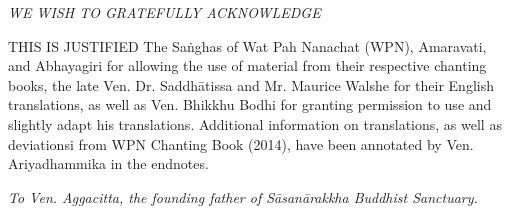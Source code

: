\cleartorecto
\thispagestyle{empty}

\mbox{}\vfill

{\centering\itshape
WE WISH TO GRATEFULLY ACKNOWLEDGE
}

THIS IS JUSTIFIED
The Saṅghas of Wat Pah Nanachat (WPN), Amaravati, and Abhayagiri for allowing the use of material from their respective chanting books, the late Ven. Dr. Saddhātissa and Mr. Maurice Walshe for their English translations, as well as Ven. Bhikkhu Bodhi for granting permission to use and slightly adapt his translations.
Additional information on translations, as well as deviationsi from WPN Chanting Book (2014), have been annotated by Ven. Ariyadhammika in the endnotes.

{\centering\itshape
To Ven. Aggacitta, the founding father of
Sāsanārakkha Buddhist Sanctuary.
}

\vfill\mbox{}

\vspace*{5\baselineskip}

